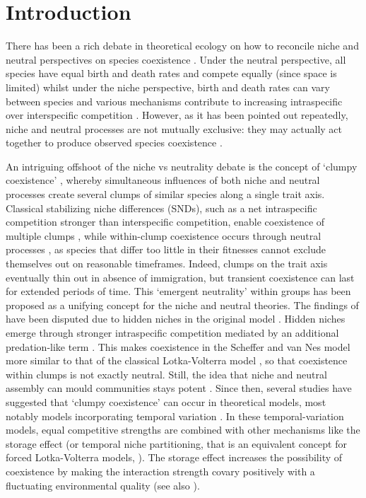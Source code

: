 \documentclass[smallcondensed,referee]{svjour3}       %
\begin{document}
\pagebreak{}
\section*{Introduction}

There has been a rich debate in theoretical ecology on how to reconcile
niche and neutral perspectives on species coexistence \citep{gravel_reconciling_2006,carmel_using_2017}.
Under the neutral perspective, all species have equal birth and death
rates and compete equally (since space is limited) whilst under the
niche perspective, birth and death rates can vary between species
and various mechanisms contribute to increasing intraspecific over
interspecific competition \citep{hubbell_unified_2001}. However,
as it has been pointed out repeatedly, niche and neutral processes
are not mutually exclusive: they may actually act together to produce
observed species coexistence \citep{gravel_reconciling_2006,mutshinda_what_2009,gotzenberger_ecological_2012}. 

An intriguing offshoot of the niche vs neutrality debate is the concept
of `clumpy coexistence' \citep{scheffer_self-organized_2006}, whereby
simultaneous influences of both niche and neutral processes create
several clumps of similar species along a single trait axis. Classical
stabilizing niche differences (SNDs), such as a net intraspecific
competition stronger than interspecific competition, enable coexistence
of multiple clumps \citep{chesson_mechanisms_2000}, while within-clump
coexistence occurs through neutral processes \citep{hubbell_unified_2001,munoz_neutral_2016},
as species that differ too little in their fitnesses cannot exclude
themselves out on reasonable timeframes. Indeed, clumps on the trait
axis eventually thin out in absence of immigration, but transient
coexistence can last for extended periods of time. This `emergent
neutrality' within groups \citep{holt_emergent_2006} has been proposed
as a unifying concept for the niche and neutral theories. The findings
of \citet{scheffer_self-organized_2006} have been disputed due to
hidden niches in the original model \citep{barabas_emergent_2013}.
Hidden niches emerge through stronger intraspecific competition mediated
by an additional predation-like term \citep{barabas_emergent_2013}.
This makes coexistence in the Scheffer and van Nes model more similar
to that of the classical Lotka-Volterra model \citep{barabas_effect_2016},
so that coexistence within clumps is not exactly neutral. Still, the
idea that niche and neutral assembly can mould communities stays potent
\citep{haegeman_mathematical_2011,vergnon_interpretation_2013}. Since
then, several studies have suggested that `clumpy coexistence' can
occur in theoretical models, most notably models incorporating temporal
variation \citep{scranton_coexistence_2016,sakavara_lumpy_2018}.
In these temporal-variation models, equal competitive strengths are
combined with other mechanisms like the storage effect (or temporal
niche partitioning, that is an equivalent concept for forced Lotka-Volterra
models, \citealp{barabas_community_2012,scranton_coexistence_2016}).
The storage effect increases the possibility of coexistence by making
the interaction strength covary positively with a fluctuating environmental
quality (see also \citealp{barabas_community_2012}). 
\end{document}
